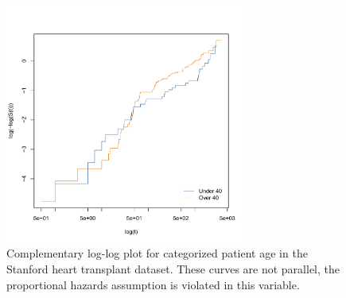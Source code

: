 \begin{figure}[H]
\centering
\includegraphics[width=0.7\textwidth]{figures/survival/stanford_cloglog}
\vspace{0.2cm}
\caption{
Complementary log-log plot for categorized patient age
in the Stanford heart transplant dataset.
These curves are not parallel,
the proportional hazards assumption is violated in this variable.
}
\label{fig:stanford_cloglog}
\end{figure}

